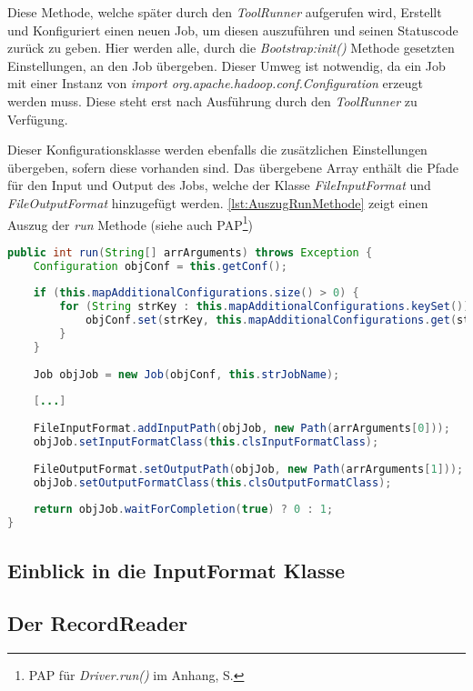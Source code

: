 Diese Methode, welche später durch den \textit{ToolRunner} aufgerufen wird, Erstellt und Konfiguriert einen neuen Job, um diesen auszuführen und seinen Statuscode zurück zu geben. Hier werden alle, durch die \textit{Bootstrap:init()} Methode gesetzten Einstellungen, an den Job übergeben. Dieser Umweg ist notwendig, da ein Job mit einer Instanz von \textit{import org.apache.hadoop.conf.Configuration} erzeugt werden muss. Diese steht erst nach Ausführung durch den \textit{ToolRunner} zu Verfügung.

Dieser Konfigurationsklasse werden ebenfalls die zusätzlichen Einstellungen übergeben, sofern diese vorhanden sind. Das übergebene Array enthält die Pfade für den Input und Output des Jobs, welche der Klasse \textit{FileInputFormat} und \textit{FileOutputFormat} hinzugefügt werden. \autoref{lst:AuszugRunMethode} zeigt einen Auszug der \textit{run} Methode (siehe auch \ac{PAP}\footnote{\ac{PAP} für \textit{Driver.run()} im Anhang, S. \pageref{subsec:PAPDriverRun}}) \\

\begin{lstlisting}[language=Java,caption=Auszug der \textit{run()} Methode,label=lst:AuszugRunMethode]
public int run(String[] arrArguments) throws Exception {
	Configuration objConf = this.getConf();
	
	if (this.mapAdditionalConfigurations.size() > 0) {
		for (String strKey : this.mapAdditionalConfigurations.keySet()) {
			objConf.set(strKey, this.mapAdditionalConfigurations.get(strKey));
		}
	}
	
	Job objJob = new Job(objConf, this.strJobName);
	
	[...]
	
	FileInputFormat.addInputPath(objJob, new Path(arrArguments[0]));
	objJob.setInputFormatClass(this.clsInputFormatClass);
	
	FileOutputFormat.setOutputPath(objJob, new Path(arrArguments[1]));
	objJob.setOutputFormatClass(this.clsOutputFormatClass);
	
	return objJob.waitForCompletion(true) ? 0 : 1;
}
\end{lstlisting}

\subsection{Einblick in die InputFormat Klasse}


\subsection{Der RecordReader}


